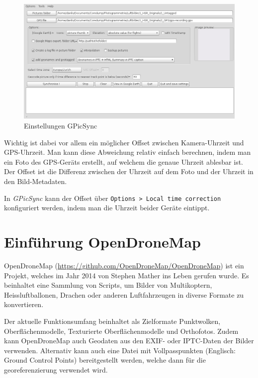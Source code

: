 \begin{figure}[h!]
	\centering
	\includegraphics[width=\textwidth]{images/gpicsync}
	\caption{Einstellungen GPicSync}
	\label{img:gpicsync}
\end{figure}

Wichtig ist dabei vor allem ein möglicher Offset zwischen Kamera-Uhrzeit und
GPS-Uhrzeit. Man kann diese Abweichung relativ einfach berechnen, indem man ein
Foto des GPS-Geräts erstellt, auf welchem die genaue Uhrzeit ablesbar ist.
Der Offset ist die Differenz zwischen der Uhrzeit auf dem Foto und der Uhrzeit
in den Bild-Metadaten.

In \textit{GPicSync} kann der Offset über \texttt{Options > Local time
correction} konfiguriert werden, indem man die Uhrzeit beider Geräte eintippt.


\section{Einführung OpenDroneMap}

\label{opendronemap}

OpenDroneMap (\url{https://github.com/OpenDroneMap/OpenDroneMap}) ist ein
Projekt, welches im Jahr 2014 von Stephen Mather ins Leben gerufen
wurde\cite{smathermather:2014}. Es beinhaltet eine Sammlung von Scripts, um
Bilder von Multikoptern, Heissluftballonen, Drachen oder anderen Luftfahrzeugen
in diverse Formate zu konvertieren.

Der aktuelle Funktionsumfang beinhaltet als Zielformate Punktwolken,
Oberflächenmodelle, Texturierte Oberflächenmodelle und Orthofotos. Zudem kann
OpenDroneMap auch Geodaten aus den EXIF- oder IPTC-Daten der Bilder verwenden.
Alternativ kann auch eine Datei mit Vollpasspunkten (Englisch: Ground Control
Points) bereitgestellt werden, welche dann für die georeferenzierung verwendet
wird.

